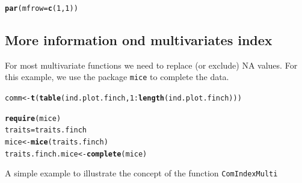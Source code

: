 \documentclass[12pt]{article}\usepackage[]{graphicx}\usepackage[]{color}
\makeatletter
\newcommand{\hlnum}[1]{\textcolor[rgb]{0.686,0.059,0.569}{#1}}%
\newcommand{\hlopt}[1]{\textcolor[rgb]{0,0,0}{#1}}%
\newcommand{\hlstd}[1]{\textcolor[rgb]{0.345,0.345,0.345}{#1}}%
\newcommand{\hlkwb}[1]{\textcolor[rgb]{0.69,0.353,0.396}{#1}}%
\newcommand{\hlkwc}[1]{\textcolor[rgb]{0.333,0.667,0.333}{#1}}%
\newcommand{\hlkwd}[1]{\textcolor[rgb]{0.737,0.353,0.396}{\textbf{#1}}}%
\newenvironment{kframe}{%
 \def\at@end@of@kframe{}%
 \ifinner\ifhmode%
  \def\at@end@of@kframe{\end{minipage}}%
  \begin{minipage}{\columnwidth}%
 \fi\fi%
 \def\FrameCommand##1{\hskip\@totalleftmargin \hskip-\fboxsep
 \colorbox{shadecolor}{##1}\hskip-\fboxsep
     \hskip-\linewidth \hskip-\@totalleftmargin \hskip\columnwidth}%
 \MakeFramed {\advance\hsize-\width
   \@totalleftmargin\z@ \linewidth\hsize
   \@setminipage}}%
 {\par\unskip\endMakeFramed%
 \at@end@of@kframe}
\newenvironment{knitrout}{}{} %
\makeatother
\begin{document}
\begin{knitrout}
\begin{kframe}\begin{alltt}
\hlkwd{par}\hlstd{(}\hlkwc{mfrow} \hlstd{=} \hlkwd{c}\hlstd{(}\hlnum{1}\hlstd{,}\hlnum{1}\hlstd{))}
\end{alltt}
\end{kframe}
\end{knitrout}



\newpage

\subsection{More information ond multivariates index}

For most multivariate functions we need to replace (or exclude) NA values. For this example, we use the package \texttt{mice} to complete the data.

\begin{knitrout}
\color{fgcolor}\begin{kframe}
\begin{alltt}
\hlstd{comm}\hlkwb{<-}\hlkwd{t}\hlstd{(}\hlkwd{table}\hlstd{(ind.plot.finch,}\hlnum{1}\hlopt{:}\hlkwd{length}\hlstd{(ind.plot.finch)))}

\hlkwd{require}\hlstd{(mice)}
\hlstd{traits} \hlkwb{=} \hlstd{traits.finch}
\hlstd{mice}\hlkwb{<-}\hlkwd{mice}\hlstd{(traits.finch)}
\hlstd{traits.finch.mice}\hlkwb{<-}\hlkwd{complete}\hlstd{(mice)}
\end{alltt}
\end{kframe}
\end{knitrout}

A simple example to illustrate the concept of the function \texttt{ComIndexMulti}
\end{document}

